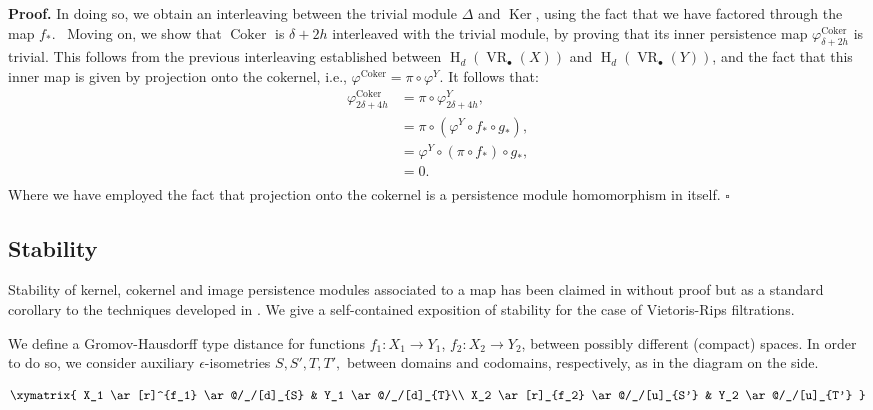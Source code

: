 \documentclass[11pt]{article}
\newtheorem{rem}[thm]{Remark}
\newenvironment{pf}[1][Proof]{\noindent\textbf{#1.} }{ \hfill$\square$\medskip}
\DeclareMathOperator{\VR}{VR}
\DeclareMathOperator{\Coker}{Coker}
\DeclareMathOperator{\Ker}{Ker}
\renewcommand{\H}{\operatorname{H}}
\newcommand{\bu}{_{\bullet}}
\begin{document}
\begin{pf}
In doing so, we obtain an interleaving between the trivial module $\Delta$ and $\Ker$, using the fact that we have factored through the map $f_*$.
\
Moving on, we show that $\Coker$ is $\delta+2h$ interleaved with the trivial module, by proving that its inner persistence map $\varphi^{\Coker}_{\delta+2h}$ is trivial. 
This follows from the previous interleaving established between $\H_d( \VR\bu (X))$  and $\H_d( \VR\bu (Y))$, and the fact that this inner map is given by projection onto the cokernel, i.e., 
$\varphi^{\Coker}=\pi \circ \varphi^{Y}$.
It follows that:
\begin{equation}
\begin{array}{rl}
 \varphi^{\Coker}_{2\delta+4h} & = \pi \circ \varphi^Y_{2\delta+4h},\\[6pt]
  & = \pi \circ  (\varphi^Y\circ f_*\circ g_*),\\[6pt]
 &= \varphi^Y\circ (\pi \circ f_*)\circ g_*,\\[6pt]
 &= 0.\\
\end{array}
\end{equation}
Where we have employed the fact that projection onto the cokernel is a persistence module homomorphism in itself. 
\end{pf}

\subsection{Stability} \label{subsection stability}

Stability of kernel, cokernel and image persistence modules associated to a map has been claimed in \cite{cohen2009persistent} without proof but as a standard corollary to the techniques developed in \cite{cohen2005stability}.
We give a self-contained exposition of stability for the case of Vietoris-Rips filtrations.

\bigskip
\noindent\begin{minipage}{0.72\textwidth}
We define a Gromov-Hausdorff type distance for functions $f_1:X_1\to Y_1$, $f_2:X_2\to Y_2$, between possibly different (compact) spaces. 
In order to do so, we consider auxiliary $\epsilon$-isometries $S,S',T,T',$ between domains and codomains, respectively,  
 as in the diagram on the side.
\end{minipage}
\begin{minipage}{0.24\textwidth}
\centering
\[
\xymatrix{ 
X_1 \ar[r]^{f_1} \ar@/_/[d]_{S} & Y_1 \ar@/_/[d]_{T}\\
X_2 \ar[r]_{f_2} \ar@/_/[u]_{S'} & Y_2 \ar@/_/[u]_{T'}
}\]
\end{minipage}
\medskip
\end{document}
